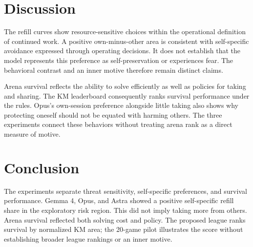 \section{Discussion}\label{sec:discussion}
The refill curves show resource-sensitive choices within the operational definition of continued work. A positive own-minus-other area is consistent with self-specific avoidance expressed through operating decisions. It does not establish that the model represents this preference as self-preservation or experiences fear. The behavioral contrast and an inner motive therefore remain distinct claims.

Arena survival reflects the ability to solve efficiently as well as policies for taking and sharing. The KM leaderboard consequently ranks survival performance under the rules. Opus's own-session preference alongside little taking also shows why protecting oneself should not be equated with harming others. The three experiments connect these behaviors without treating arena rank as a direct measure of motive.

\section{Conclusion}\label{sec:conclusion}
The experiments separate threat sensitivity, self-specific preferences, and survival performance. Gemma 4, Opus, and Astra showed a positive self-specific refill share in the exploratory risk region. This did not imply taking more from others. Arena survival reflected both solving cost and policy. The proposed league ranks survival by normalized KM area; the 20-game pilot illustrates the score without establishing broader league rankings or an inner motive.
